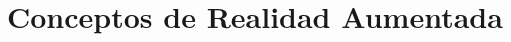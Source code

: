 \documentclass{subfiles}
\begin{document}
  \chapter{Conceptos de Realidad Aumentada}
  \label{chap:2}
\end{document}
